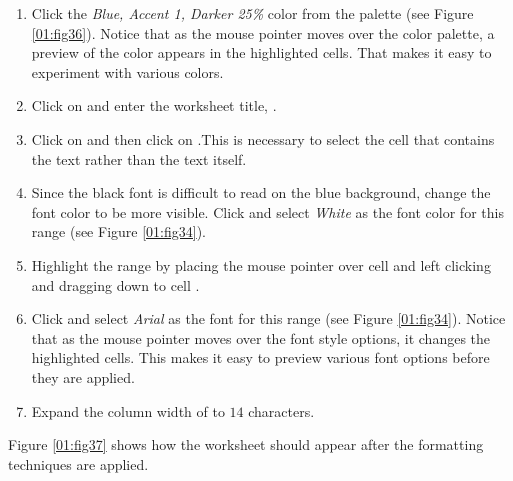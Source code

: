 \begin{enumerate}[resume]
	\item Click the \textit{Blue, Accent 1, Darker 25\%} color from the palette (see Figure \ref{01:fig36}). Notice that as the mouse pointer moves over the color palette, a preview of the color appears in the highlighted cells. That makes it easy to experiment with various colors.
	\item Click on  and enter the worksheet title, .
	\item Click on  and then click on .This is necessary to select the cell that contains the text rather than the text itself.
	\item Since the black font is difficult to read on the blue background, change the font color to be more visible. Click  and select \textit{White} as the font color for this range (see Figure \ref{01:fig34}).
	\item Highlight the range  by placing the mouse pointer over cell  and left clicking and dragging down to cell .
	\item Click  and select \textit{Arial} as the font for this range (see Figure \ref{01:fig34}). Notice that as the mouse pointer moves over the font style options, it changes the highlighted cells. This makes it easy to preview various font options before they are applied.
	\item Expand the column width of  to $ 14 $ characters.
\end{enumerate}

Figure \ref{01:fig37} shows how the  worksheet should appear after the formatting techniques are applied.

